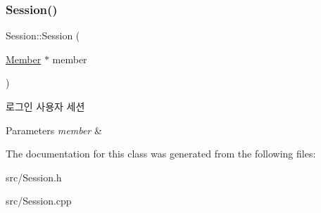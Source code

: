 \subsubsection{\texorpdfstring{Session()}{Session()}\hspace{0.1cm}{\footnotesize\ttfamily [2/2]}}
{\footnotesize\ttfamily Session\+::\+Session (\begin{DoxyParamCaption}\item[{\mbox{\hyperlink{class_member}{Member}} $\ast$}]{member }\end{DoxyParamCaption})}

로그인 사용자 세션 
\begin{DoxyParams}{Parameters}
{\em member} & \\
\hline
\end{DoxyParams}


The documentation for this class was generated from the following files\+:\begin{DoxyCompactItemize}
\item 
src/Session.\+h\item 
src/Session.\+cpp\end{DoxyCompactItemize}
